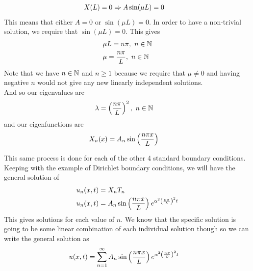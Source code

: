 \documentclass[11pt, fleqn]{article}
\begin{document}
\begin{enumerate}
\begin{align*}
        &X(L)=0\Rightarrow A\sin(\mu L)=0
    \end{align*}
    This means that either $A=0$ or $\sin(\mu L)=0$. In order to have a non-trivial solution, we require that $\sin(\mu L)=0$. This gives
    \begin{align*}
        &\mu L=n\pi,\ n\in\mathbb{N}\\
        &\mu=\frac{n\pi}{L},\ n\in\mathbb{N}
    \end{align*}
    Note that we have $n\in\mathbb{N}$ and $n\geq1$ because we require that $\mu\neq 0$ and having negative $n$ would not give any new linearly independent solutions.\\
    And so our eigenvalues are
    \begin{align*}
        &\lambda=\left( \frac{n\pi}{L} \right)^2,\ n\in\mathbb{N}
    \end{align*}
    and our eigenfunctions are
    \begin{align*}
        &X_n(x)=A_n\sin\left( \frac{n\pi x}{L} \right)
    \end{align*}
\end{enumerate}
This same process is done for each of the other 4 standard boundary conditions.\\

Keeping with the example of Dirichlet boundary conditions, we will have the general solution of
\begin{align*}
    &u_n(x,t)=X_nT_n\\
    &u_n(x,t)=A_n\sin\left( \frac{n\pi x}{L} \right)e^{\alpha^2\left( \frac{n\pi}{L} \right)^2t}
\end{align*}
This gives solutions for each value of $n$. We know that the specific solution is going to be some linear combination of each individual solution though so we can write the general solution as
\begin{align*}
    &u(x,t)=\sum_{n=1}^\infty A_n\sin\left( \frac{n\pi x}{L} \right)e^{\alpha^2\left( \frac{n\pi}{L} \right)^2t}
\end{align*}
\end{document}
